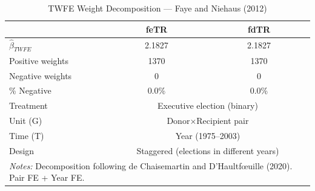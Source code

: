 \begin{table}[htbp]
\centering
\caption{TWFE Weight Decomposition --- Faye and Niehaus (2012)}
\label{tab:fayeniehaus_twowayfe}
\begin{tabular}{lcc}
\toprule
 & feTR & fdTR \\
\midrule
$\hat{\beta}_{TWFE}$ & 2.1827 & 2.1827 \\
Positive weights & 1370 & 1370 \\
Negative weights & 0 & 0 \\
\% Negative & 0.0\% & 0.0\% \\
\addlinespace
Treatment & \multicolumn{2}{c}{Executive election (binary)} \\
Unit (G) & \multicolumn{2}{c}{Donor$\times$Recipient pair} \\
Time (T) & \multicolumn{2}{c}{Year (1975--2003)} \\
Design & \multicolumn{2}{c}{Staggered (elections in different years)} \\
\bottomrule
\multicolumn{3}{p{0.85\linewidth}}{\footnotesize
 \textit{Notes:} Decomposition following de Chaisemartin and
 D'Haultf\oe uille (2020). Pair FE + Year FE.}
\end{tabular}
\end{table}
